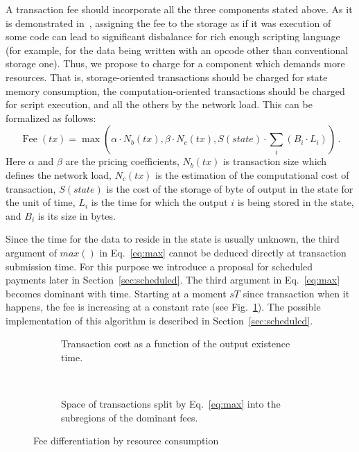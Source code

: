 \documentclass[]{llncs}   %
\begin{document}
A transaction fee should incorporate all the three components stated above.  As
it is demonstrated in~\cite{Earlz2017}, assigning the fee to the storage as if
it was execution of some code can lead to significant disbalance for rich enough
scripting language (for example, for the data being written with an opcode other
than conventional storage one).  Thus, we propose to charge for a component
which demands more resources. That is, storage-oriented transactions should be
charged for state memory consumption, the computation-oriented transactions
should be charged for script execution, and all the others by the network load.
This can be formalized as follows:
\begin{equation}
    \operatorname{Fee}(tx) = \max\left(\alpha \cdot N_b(tx), \beta \cdot N_c(tx),
    S(state) \cdot \sum_i (B_i \cdot L_i) \right)\,.
    \label{eq:max}
\end{equation}
Here $\alpha$ and $\beta$ are the pricing coefficients, $N_b(tx)$ is transaction size 
which defines the network load, $N_c(tx)$ is the estimation of the computational 
cost of transaction, $S(state)$ is the cost of the storage of byte of output in the 
state for the unit of time, $L_i$ is the time for which the output $i$ is being stored 
in the state, and $B_i$ is its size in bytes.

Since the time for the data to reside in the state is usually unknown,
the third argument of $max()$ in Eq.~\eqref{eq:max} cannot be deduced directly at
transaction submission time. For this purpose we introduce a proposal for 
scheduled payments later in Section~\ref{sec:scheduled}. The third
argument in Eq.~\eqref{eq:max} becomes dominant with time. Starting at a moment $sT$ since transaction when it happens, the
fee is increasing at a constant rate (see Fig.~\ref{fig:max_t}). The possible implementation of this 
algorithm is described in Section~\ref{sec:scheduled}.
\begin{figure}[h]
    \centering
    \begin{subfigure}[b]{.45\textwidth}
    
    \caption{Transaction cost as a function of the output existence time.
        \newline
        \label{fig:max_t}}
    \end{subfigure}
    ~
    \begin{subfigure}[b]{.45\textwidth}
        
        \caption{Space of transactions split by
            Eq.~\eqref{eq:max} into the subregions of the dominant fees.
            \label{fig:max}}
        \end{subfigure}
        \caption{Fee differentiation by resource consumption}
\end{figure}
\end{document}
